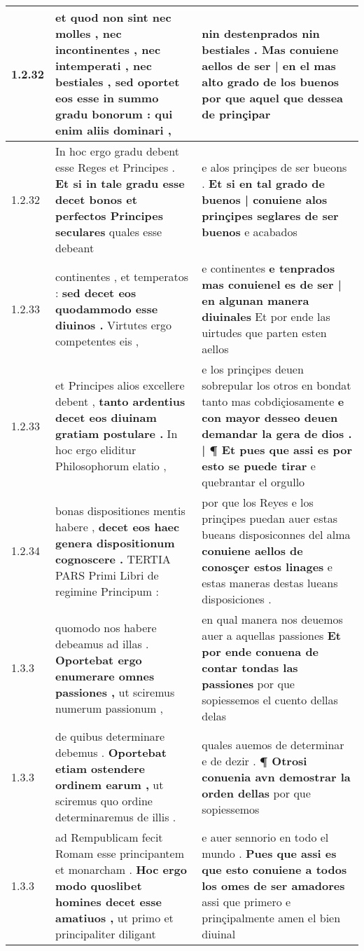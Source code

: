 \begin{tabular}{|p{1cm}|p{6.5cm}|p{6.5cm}|}
1.2.32 & et quod non sint nec molles , nec incontinentes , nec intemperati , nec bestiales , \textbf{ sed oportet eos esse in summo gradu bonorum : } qui enim aliis dominari , & nin destenprados nin bestiales . \textbf{ Mas conuiene aellos de ser | en el mas alto grado de los buenos } por que aquel que dessea de prinçipar \\\hline
1.2.32 & In hoc ergo gradu debent esse Reges et Principes . \textbf{ Et si in tale gradu esse decet bonos et perfectos Principes seculares } quales esse debeant & e alos prinçipes de ser bueons . \textbf{ Et si en tal grado de buenos | conuiene alos prinçipes seglares de ser buenos } e acabados \\\hline
1.2.33 & continentes , et temperatos : \textbf{ sed decet eos quodammodo esse diuinos . } Virtutes ergo competentes eis , & e continentes \textbf{ e tenprados mas conuienel es de ser | en algunan manera diuinales } Et por ende las uirtudes que parten esten aellos \\\hline
1.2.33 & et Principes alios excellere debent , \textbf{ tanto ardentius decet eos diuinam gratiam postulare . } In hoc ergo eliditur Philosophorum elatio , & e los prinçipes deuen sobrepular los otros en bondat tanto mas cobdiçiosamente \textbf{ e con mayor desseo deuen demandar la gera de dios . | ¶ Et pues que assi es por esto se puede tirar } e quebrantar el orgullo \\\hline
1.2.34 & bonas dispositiones mentis habere , \textbf{ decet eos haec genera dispositionum cognoscere . } TERTIA PARS Primi Libri de regimine Principum : & por que los Reyes e los prinçipes puedan auer estas bueans disposiconnes del alma \textbf{ conuiene aellos de conosçer estos linages } e estas maneras destas lueans disposiciones . \\\hline
1.3.3 & quomodo nos habere debeamus ad illas . \textbf{ Oportebat ergo enumerare omnes passiones , } ut sciremus numerum passionum , & en qual manera nos deuemos auer a aquellas passiones \textbf{ Et por ende conuena de contar tondas las passiones } por que sopiessemos el cuento dellas delas \\\hline
1.3.3 & de quibus determinare debemus . \textbf{ Oportebat etiam ostendere ordinem earum , } ut sciremus quo ordine determinaremus de illis . & quales auemos de determinar e de dezir . \textbf{ ¶ Otrosi conuenia avn demostrar la orden dellas } por que sopiessemos \\\hline
1.3.3 & ad Rempublicam fecit Romam esse principantem et monarcham . \textbf{ Hoc ergo modo quoslibet homines decet esse amatiuos , } ut primo et principaliter diligant & e auer sennorio en todo el mundo . \textbf{ Pues que assi es que esto conuiene a todos los omes de ser amadores } assi que primero e prinçipalmente amen el bien diuinal \\\hline

\end{tabular}

